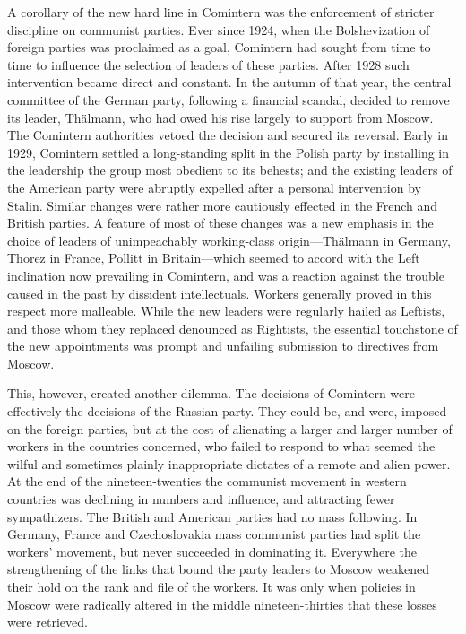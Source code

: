 A corollary of the new hard line in Comintern was the enforcement of stricter discipline on communist parties. Ever since 1924, when the Bolshevization of foreign parties was proclaimed as a goal, Comintern had sought from time to time to influence the selection of leaders of these parties. After 1928 such intervention became direct and constant. In the autumn of that year, the central committee of the German party, following a financial scandal, decided to remove its leader, Thälmann, who had owed his rise largely to support from Moscow. The Comintern authorities vetoed the decision and secured its reversal. Early in 1929, Comintern settled a long-standing split in the Polish party by installing in the leadership the group most obedient to its behests; and the existing leaders of the American party were abruptly expelled after a personal intervention by Stalin. Similar changes were rather more cautiously effected in the French and British parties. A feature of most of these changes was a new emphasis in the choice of leaders of unimpeachably working-class origin---Thälmann in Germany, Thorez in France, Pollitt in Britain---which seemed to accord with the Left inclination now prevailing in Comintern, and was a reaction against the trouble caused in the past by dissident intellectuals. Workers generally proved in this respect more malleable. While the new leaders were regularly hailed as Leftists, and those whom they replaced denounced as Rightists, the essential touchstone of the new appointments was prompt and unfailing submission to directives from Moscow. 

This, however, created another dilemma. The decisions of Comintern were effectively the decisions of the Russian party. They could be, and were, imposed on the foreign parties, but at the cost of alienating a larger and larger number of workers in the countries concerned, who failed to respond to what seemed the wilful and sometimes plainly inappropriate dictates of a remote and alien power. At the end of the nineteen-twenties the communist movement in western countries was declining in numbers and influence, and attracting fewer sympathizers. The British and American parties had no mass following. In Germany, France and Czechoslovakia mass communist parties had split the workers' movement, but never succeeded in dominating it. Everywhere the strengthening of the links that bound the party leaders to Moscow weakened their hold on the rank and file of the workers. It was only when policies in Moscow were radically altered in the middle nineteen-thirties that these losses were retrieved. 

